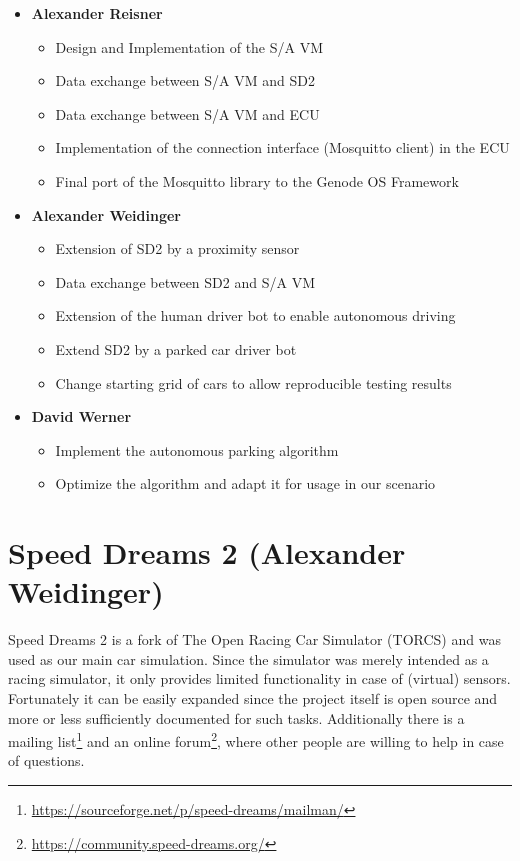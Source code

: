 \documentclass[paper=a4, fontsize=11pt]{scrreprt}
\begin{document}
\begin{itemize}
  \item \textbf{Alexander Reisner}
  \begin{itemize}
    \item Design and Implementation of the S/A VM
    \item Data exchange between S/A VM and SD2
    \item Data exchange between S/A VM and ECU
    \item Implementation of the connection interface (Mosquitto client) in the ECU
    \item Final port of the Mosquitto library to the Genode OS Framework
  \end{itemize}
  \item \textbf{Alexander Weidinger}
  \begin{itemize}
    \item Extension of SD2 by a proximity sensor
    \item Data exchange between SD2 and S/A VM
    \item Extension of the human driver bot to enable autonomous driving
    \item Extend SD2 by a parked car driver bot
    \item Change starting grid of cars to allow reproducible testing results
  \end{itemize}
  \item \textbf{David Werner}
  \begin{itemize}
    \item Implement the autonomous parking algorithm
    \item Optimize the algorithm and adapt it for usage in our scenario
  \end{itemize}
\end{itemize}

\chapter{Speed Dreams 2 (Alexander Weidinger)}
Speed Dreams 2 is a fork of The Open Racing Car Simulator (TORCS)
and was used as our main car simulation.
Since the simulator was merely intended as a racing simulator,
it only provides limited functionality in case of (virtual) sensors.
Fortunately it can be easily expanded since the project itself is open source
and more or less sufficiently documented for such tasks.
Additionally there is a mailing list\footnote{\url{https://sourceforge.net/p/speed-dreams/mailman/}}
and an online forum\footnote{\url{https://community.speed-dreams.org/}},
where other people are willing to help in case of questions.
\end{document}
